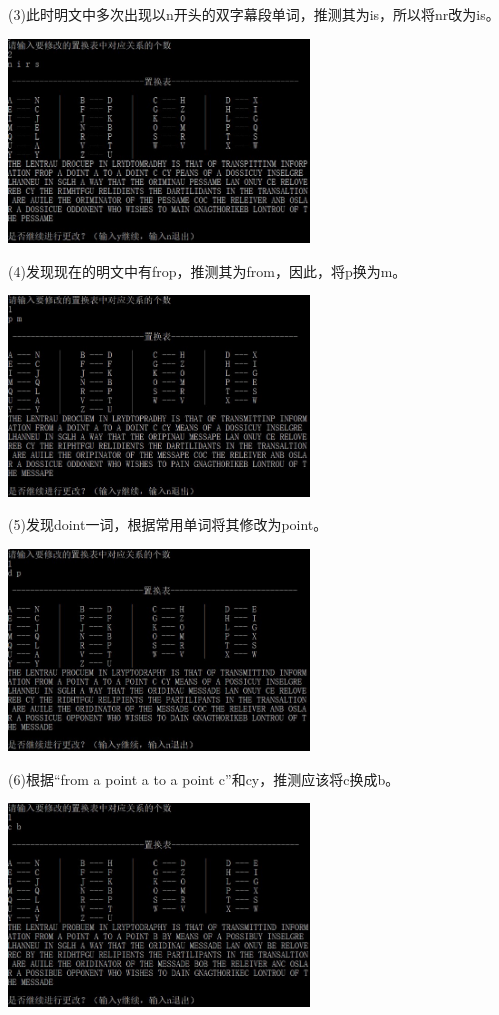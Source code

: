 \documentclass[UTF8,a4paper]{article}
\begin{document}
	(3)此时明文中多次出现以n开头的双字幕段单词，推测其为is，所以将nr改为is。\par 
					\begin{center}
		\includegraphics[width=0.6\textwidth]{pic3.JPG}
	\end{center}

	(4)发现现在的明文中有frop，推测其为from，因此，将p换为m。\par 
					\begin{center}
		\includegraphics[width=0.6\textwidth]{pic4.JPG}
	\end{center}

	(5)发现doint一词，根据常用单词将其修改为point。\par 
					\begin{center}
		\includegraphics[width=0.6\textwidth]{pic5.JPG}
	\end{center}

	(6)根据“from a point a to a point c”和cy，推测应该将c换成b。\par 
					\begin{center}
		\includegraphics[width=0.6\textwidth]{pic6.JPG}
	\end{center}
\end{document}
